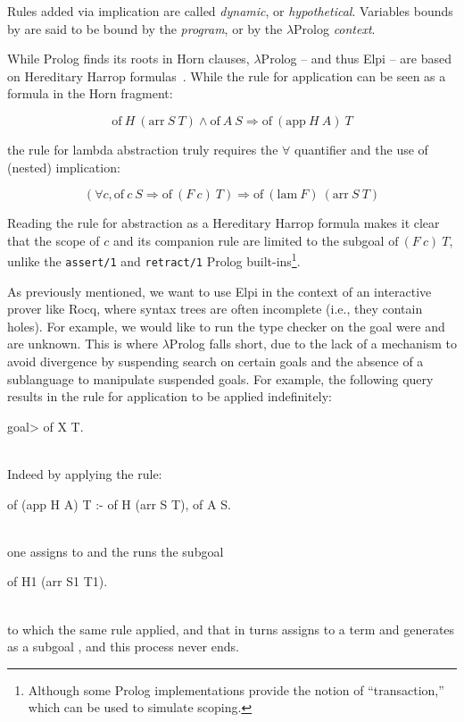 \documentclass[a4paper, 11pt]{book}
\newenvironment{elpicode}
  {\VerbatimEnvironment~\\\begin{elpibox}\begin{xelpicode}}{\end{xelpicode}
\end{elpibox}\\}
\begin{document}
Rules added via implication are called \emph{dynamic}, or \emph{hypothetical}.
Variables bounds by  are said to be bound by the \emph{program},
or by the $\lambda$Prolog \emph{context}.


While Prolog finds its roots in Horn clauses, $\lambda$Prolog -- and thus Elpi -- are
based on Hereditary Harrop formulas~\cite{Miller_Nadathur_2012}. While the rule
for application can be seen as a formula in the Horn fragment:

$$
\mathrm{of}~ H~(\mathrm{arr}~S~T) \land \mathrm{of}~A~S \Rightarrow
\mathrm{of}~(\mathrm{app}~H~A)~T
$$

\noindent the rule for lambda abstraction truly requires the $\forall$
quantifier and the use of (nested) implication:

$$
(\forall c, \mathrm{of}~c~S \Rightarrow  \mathrm{of}~(F~c)~T) \Rightarrow
\mathrm{of}~(\mathrm{lam}~F)~(\mathrm{arr}~S~T)
$$

Reading the rule for abstraction as a Hereditary Harrop formula makes it clear
that the scope of $c$ and its companion rule are limited to the subgoal
$\mathrm{of}~(F~c)~T$, unlike the \texttt{assert/1} and \texttt{retract/1}
Prolog built-ins\footnote{Although some Prolog implementations provide the
notion of ``transaction,'' which can be used to simulate scoping.}.

As previously mentioned, we want to use Elpi in the context of an interactive
prover like Rocq, where syntax trees are often incomplete (i.e., they contain
holes). For example, we would like to run the type checker on the goal
 were  and  are unknown.
This is where $\lambda$Prolog falls short, due to the
lack of a mechanism to avoid divergence by suspending search on certain goals
and the absence of a sublanguage to manipulate suspended goals.
For example, the following query results in the rule for application to
be applied indefinitely:
\begin{elpicode}
goal> of X T. %
\end{elpicode}
Indeed by applying the rule:
\begin{elpicode}
of (app H A) T :- of H (arr S T), of A S.
\end{elpicode}
one assigns  to  and the runs the subgoal
\begin{elpicode}
of H1 (arr S1 T1). 
\end{elpicode}
to which the same rule applied, and that in turns assigns to 
a term  and generates as a subgoal ,
and this process never ends.
\end{document}

